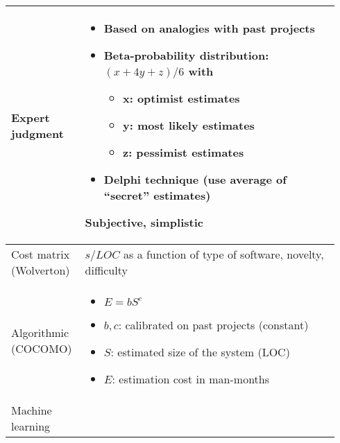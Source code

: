 \begin{table}[!ht]
    \begin{tabular}{p{0.19\linewidth}|p{0.75\linewidth}}
        \toprule
        Expert judgment & \begin{minipage}{\linewidth}\begin{itemize}
                            \item Based on analogies with past projects
                            \item Beta-probability distribution: $(x+4y+z)/6$ with
                                \begin{itemize}
                                    \item x: optimist estimates
                                    \item y: most likely estimates
                                    \item z: pessimist estimates
                                \end{itemize}
                            \item Delphi technique (use average of \enquote{secret}
                            estimates)
                          \end{itemize}
                          Subjective, simplistic\end{minipage} \\
        \midrule
        Cost matrix (Wolverton) &   $s/LOC$ as a function of type of software,
                                    novelty, difficulty \\
        \midrule
        Algorithmic (COCOMO) & \begin{minipage}{\linewidth}\begin{itemize}
                                    \item $E = b {S}^{c}$
                                    \item $b,c$: calibrated on past projects (constant)
                                    \item $S$: estimated size of the system (LOC)
                                    \item $E$: estimation cost in man-months
                               \end{itemize}\end{minipage} \\
        \midrule
        Machine learning &  \begin{minipage}{\linewidth}\begin{itemize}

\end{itemize}
\end{minipage}
\end{tabular}
\end{table}
